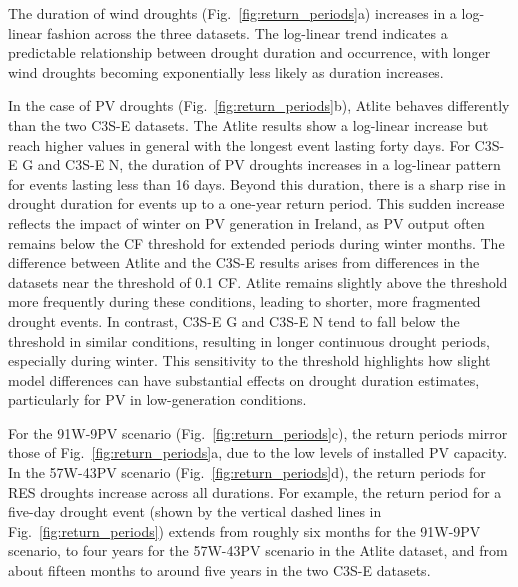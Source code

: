 \documentclass[preprint, 12pt]{elsarticle}
\begin{document}
The duration of wind droughts (Fig.~\ref{fig:return_periods}a) increases in a log-linear fashion across the three datasets. The log-linear trend indicates a predictable relationship between drought duration and occurrence, with longer wind droughts becoming exponentially less likely as duration increases. 

In the case of PV droughts (Fig.~\ref{fig:return_periods}b), Atlite behaves differently than the two C3S-E datasets. The Atlite results show a log-linear increase but reach higher values in general with the longest event lasting forty days. For C3S-E G and C3S-E N, the duration of PV droughts increases in a log-linear pattern for events lasting less than 16 days. Beyond this duration, there is a sharp rise in drought duration for events up to a one-year return period. This sudden increase reflects the impact of winter on PV generation in Ireland, as PV output often remains below the CF threshold for extended periods during winter months. The difference between Atlite and the C3S-E results arises from differences in the datasets near the threshold of 0.1 CF. Atlite remains slightly above the threshold more frequently during these conditions, leading to shorter, more fragmented drought events. In contrast, C3S-E G and C3S-E N tend to fall below the threshold in similar conditions, resulting in longer continuous drought periods, especially during winter. This sensitivity to the threshold highlights how slight model differences can have substantial effects on drought duration estimates, particularly for PV in low-generation conditions.

For the 91W-9PV scenario (Fig.~\ref{fig:return_periods}c), the return periods mirror those of Fig.~\ref{fig:return_periods}a, due to the low levels of installed PV capacity. In the 57W-43PV scenario (Fig.~\ref{fig:return_periods}d), the return periods for RES droughts increase across all durations. For example, the return period for a five-day drought event (shown by the vertical dashed lines in Fig.~\ref{fig:return_periods}) extends from roughly six months for the 91W-9PV scenario, to four years for the 57W-43PV scenario in the Atlite dataset, and from about fifteen months to around five years in the two C3S-E datasets.
\end{document}
